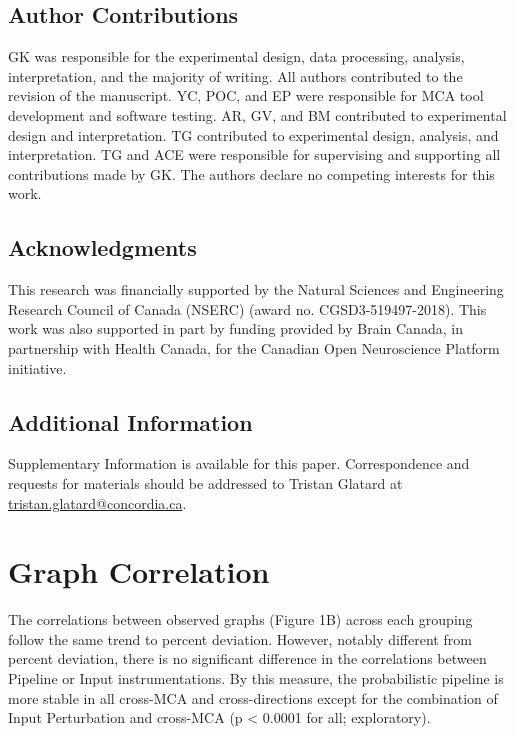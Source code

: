 \documentclass[fleqn,10pt]{SelfArx} %
\begin{document}
\subsection*{Author Contributions}
GK was responsible for the experimental design, data processing, analysis, interpretation, and the majority of writing.
All authors contributed to the revision of the manuscript. YC, POC, and EP were responsible for MCA tool development
and software testing. AR, GV, and BM contributed to experimental design and interpretation. TG contributed to
experimental design, analysis, and interpretation. TG and ACE were responsible for supervising and supporting all
contributions made by GK. The authors declare no competing interests for this work.

\subsection*{Acknowledgments} 
This research was financially supported by the Natural Sciences and Engineering Research Council of Canada (NSERC)
(award no. CGSD3-519497-2018). This work was also supported in part by funding provided by Brain Canada, in partnership
with Health Canada, for the Canadian Open Neuroscience Platform initiative.

\subsection*{Additional Information}
Supplementary Information is available for this paper. Correspondence and requests for materials should be addressed to
Tristan Glatard at \url{tristan.glatard@concordia.ca}.

\beginsupplement

\clearpage
\section{Graph Correlation}
\label{supsec:correlation}
The correlations between observed graphs (Figure 1B) across each grouping follow the same trend to percent deviation.
However, notably different from percent deviation, there is no significant difference in the correlations between
Pipeline or Input instrumentations. By this measure, the probabilistic pipeline is more stable in all cross-MCA and
cross-directions except for the combination of Input Perturbation and cross-MCA (p < 0.0001 for all; exploratory).
\end{document}

